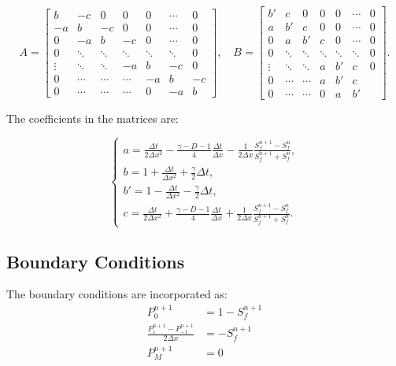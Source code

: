 \documentclass{article}
\begin{document}
\begin{equation}
A = 
\begin{bmatrix}
b & -c & 0 & 0 & 0 & \cdots & 0 \\
-a & b & -c & 0 & 0 & \cdots & 0 \\
0 & -a & b & -c & 0 & \cdots & 0 \\
0 & \ddots & \ddots & \ddots & \ddots & \ddots & 0 \\
\vdots & \ddots & \ddots & -a & b & -c & 0 \\
0 & \cdots & \cdots & \cdots & -a & b & -c \\
0 & \cdots & \cdots & \cdots & 0 & -a & b
\end{bmatrix},
\quad B = 
\begin{bmatrix}
b' & c & 0 & 0 & 0 & \cdots & 0 \\
a & b' & c & 0 & 0 & \cdots & 0 \\
0 & a & b' & c & 0 & \cdots & 0 \\
0 & \ddots & \ddots & \ddots & \ddots & \ddots & 0 \\
\vdots & \ddots & \ddots & a & b' & c & 0 \\
0 & \cdots & \cdots & a & b' & c \\
0 & \cdots & \cdots & 0 & a & b'
\end{bmatrix}.
\end{equation}

The coefficients in the matrices are:

\begin{equation}
\begin{cases}
a = \frac{\Delta t}{2 \Delta x^{2}} - \frac{\gamma-D-1}{4} \frac{\Delta t}{\Delta x} - \frac{1}{2 \Delta x} \frac{S_{f}^{n+1}-S_{f}^{n}}{S_{f}^{n+1}+S_{f}^{n}}, \\
b = 1 + \frac{\Delta t}{\Delta x^{2}} + \frac{\gamma}{2} \Delta t, \\
b' = 1 - \frac{\Delta t}{\Delta x^{2}} - \frac{\gamma}{2} \Delta t, \\
c = \frac{\Delta t}{2 \Delta x^{2}} + \frac{\gamma-D-1}{4} \frac{\Delta t}{\Delta x} + \frac{1}{2 \Delta x} \frac{S_{f}^{n+1}-S_{f}^{n}}{S_{f}^{n+1}+S_{f}^{n}}.
\end{cases}
\end{equation}



\subsection{Boundary Conditions}
The boundary conditions are incorporated as:
\begin{align}
P_0^{n+1} &= 1 - S_f^{n+1} \\
\frac{P_1^{n+1} - P_{-1}^{n+1}}{2\Delta x} &= -S_f^{n+1} \\
P_M^{n+1} &= 0
\end{align}
\end{document}
